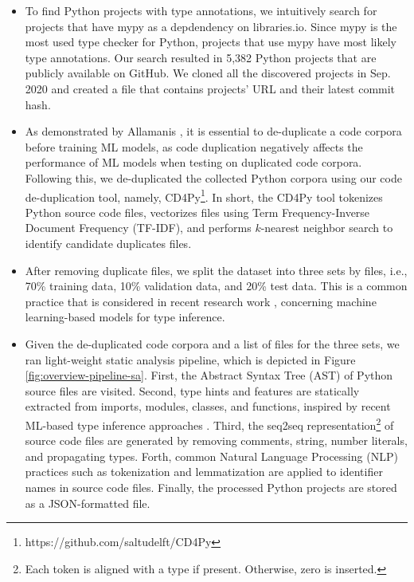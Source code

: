 \documentclass[10pt, conference]{IEEEtran}
\begin{document}
\begin{itemize}
	\item To find Python projects with type annotations, we intuitively search for projects that have mypy as a depdendency on libraries.io. Since mypy is the most used type checker for Python, projects that use mypy have most likely type annotations. Our search resulted in 5,382 Python projects that are publicly available on GitHub. We cloned all the discovered projects in Sep. 2020 and created a file that contains projects' URL and their latest commit hash.
	\item As demonstrated by Allamanis \cite{allamanis2019adverse}, it is essential to de-duplicate a code corpora before training ML models, as code duplication negatively affects the performance of ML models when testing on duplicated code corpora. Following this, we de-duplicated the collected Python corpora using our code de-duplication tool, namely, CD4Py\footnote{https://github.com/saltudelft/CD4Py}. In short, the CD4Py tool tokenizes Python source code files, vectorizes files using Term Frequency-Inverse Document Frequency (TF-IDF), and performs $k$-nearest neighbor search to identify candidate duplicates files.
	\item After removing duplicate files, we split the dataset into three sets by files, i.e., 70\% training data, 10\% validation data, and 20\% test data. This is a common practice that is considered in recent research work \cite{pradel2019typewriter, allamanis2020typilus}, concerning machine learning-based models for type inference.
	\item Given the de-duplicated code corpora and a list of files for the three sets, we ran light-weight static analysis pipeline, which is depicted in Figure \ref{fig:overview-pipeline-sa}. First, the Abstract Syntax Tree (AST) of Python source files are visited. Second, type hints and features are statically extracted from imports, modules, classes, and functions, inspired by recent ML-based type inference approaches \cite{pradel2019typewriter, malik2019nl2type}. Third, the seq2seq representation\footnote{Each token is aligned with a type if present. Otherwise, zero is inserted.} of source code files \cite{hellendoorn2018deep} are generated by removing comments, string, number literals, and propagating types. Forth, common Natural Language Processing (NLP) practices such as tokenization and lemmatization are applied to identifier names in source code files. Finally, the processed Python projects are stored as a JSON-formatted file. 
\end{itemize}
\end{document}
